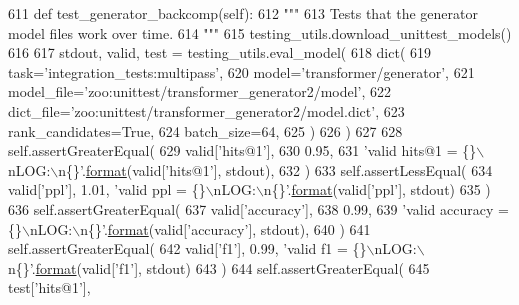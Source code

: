 \begin{DoxyCode}
611     \textcolor{keyword}{def }test\_generator\_backcomp(self):
612         \textcolor{stringliteral}{"""}
613 \textcolor{stringliteral}{        Tests that the generator model files work over time.}
614 \textcolor{stringliteral}{        """}
615         testing\_utils.download\_unittest\_models()
616 
617         stdout, valid, test = testing\_utils.eval\_model(
618             dict(
619                 task=\textcolor{stringliteral}{'integration\_tests:multipass'},
620                 model=\textcolor{stringliteral}{'transformer/generator'},
621                 model\_file=\textcolor{stringliteral}{'zoo:unittest/transformer\_generator2/model'},
622                 dict\_file=\textcolor{stringliteral}{'zoo:unittest/transformer\_generator2/model.dict'},
623                 rank\_candidates=\textcolor{keyword}{True},
624                 batch\_size=64,
625             )
626         )
627 
628         self.assertGreaterEqual(
629             valid[\textcolor{stringliteral}{'hits@1'}],
630             0.95,
631             \textcolor{stringliteral}{'valid hits@1 = \{\}\(\backslash\)nLOG:\(\backslash\)n\{\}'}.\hyperlink{namespaceparlai_1_1chat__service_1_1services_1_1messenger_1_1shared__utils_a32e2e2022b824fbaf80c747160b52a76}{format}(valid[\textcolor{stringliteral}{'hits@1'}], stdout),
632         )
633         self.assertLessEqual(
634             valid[\textcolor{stringliteral}{'ppl'}], 1.01, \textcolor{stringliteral}{'valid ppl = \{\}\(\backslash\)nLOG:\(\backslash\)n\{\}'}.\hyperlink{namespaceparlai_1_1chat__service_1_1services_1_1messenger_1_1shared__utils_a32e2e2022b824fbaf80c747160b52a76}{format}(valid[\textcolor{stringliteral}{'ppl'}], stdout)
635         )
636         self.assertGreaterEqual(
637             valid[\textcolor{stringliteral}{'accuracy'}],
638             0.99,
639             \textcolor{stringliteral}{'valid accuracy = \{\}\(\backslash\)nLOG:\(\backslash\)n\{\}'}.\hyperlink{namespaceparlai_1_1chat__service_1_1services_1_1messenger_1_1shared__utils_a32e2e2022b824fbaf80c747160b52a76}{format}(valid[\textcolor{stringliteral}{'accuracy'}], stdout),
640         )
641         self.assertGreaterEqual(
642             valid[\textcolor{stringliteral}{'f1'}], 0.99, \textcolor{stringliteral}{'valid f1 = \{\}\(\backslash\)nLOG:\(\backslash\)n\{\}'}.\hyperlink{namespaceparlai_1_1chat__service_1_1services_1_1messenger_1_1shared__utils_a32e2e2022b824fbaf80c747160b52a76}{format}(valid[\textcolor{stringliteral}{'f1'}], stdout)
643         )
644         self.assertGreaterEqual(
645             test[\textcolor{stringliteral}{'hits@1'}],

\end{DoxyCode}
